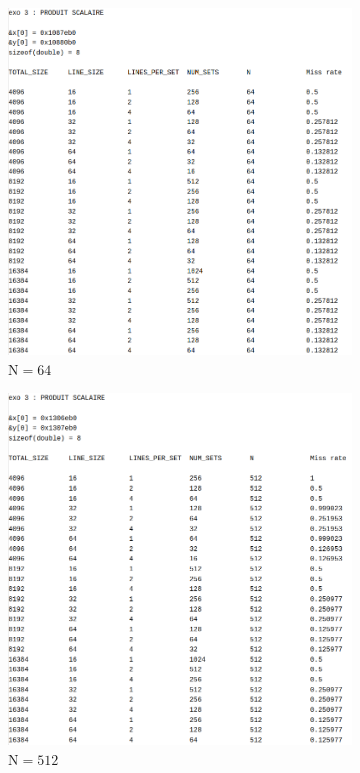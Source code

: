 \documentclass[12pt]{base}
\begin{document}
\begin{figure}[H]
\begin{subfigure}[H]{0.5\linewidth}
    \centering
    \includegraphics[width=0.75\linewidth]{1_scal_64.png}
    \caption{$\text{N}=64$}
    \label{fig:1_64}
\end{subfigure}
\begin{subfigure}[H]{0.5\linewidth}
    \centering
    \includegraphics[width=0.75\linewidth]{1_scal_512.png}
    \caption{$\text{N}=512$}
    \label{fig:1_512}
\end{subfigure}\par\bigskip
\begin{subfigure}[H]{0.5\linewidth}
    \centering

\end{subfigure}
\end{figure}
\end{document}
